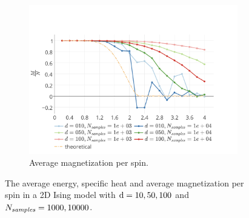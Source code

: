\begin{figure}
\begin{subfigure}{\columnwidth}
			\includegraphics[width=\textwidth]{./img/2D/averageMagnetization}
			\caption{Average magnetization per spin.}
			\label{fig:results:2D:averageMagnetization}
		\end{subfigure}		
		\caption{The  average energy,  specific heat and  average magnetization per spin in a 2D Ising model with $\mathrm{d} = 10, 50, 100$ and $N_\textit{samples} = 1000, 10000$.}
		\label{fig:results:2D}
	\end{figure}